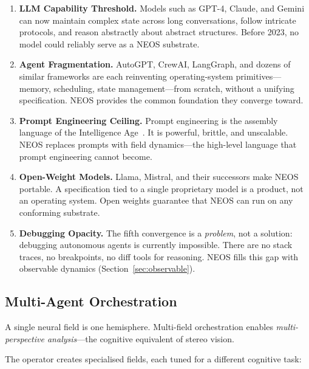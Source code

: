 \begin{enumerate}[leftmargin=*, label=\textbf{\arabic*.}]
\item \textbf{LLM Capability Threshold.}
  Models such as GPT-4, Claude, and Gemini can now maintain complex
  state across long conversations, follow intricate protocols, and
  reason abstractly about abstract structures.  Before 2023, no model
  could reliably serve as a NEOS substrate.

\item \textbf{Agent Fragmentation.}
  AutoGPT, CrewAI, LangGraph, and dozens of similar frameworks are
  each reinventing operating-system primitives---memory, scheduling,
  state management---from scratch, without a unifying specification.
  NEOS provides the common foundation they converge toward.

\item \textbf{Prompt Engineering Ceiling.}
  Prompt engineering is the assembly language of the Intelligence
  Age~\cite{reynolds2021prompt}.  It is powerful, brittle, and
  unscalable.  NEOS replaces prompts with field dynamics---the
  high-level language that prompt engineering cannot become.

\item \textbf{Open-Weight Models.}
  Llama, Mistral, and their successors make NEOS portable.  A
  specification tied to a single proprietary model is a product, not
  an operating system.  Open weights guarantee that NEOS can run on
  any conforming substrate.

\item \textbf{Debugging Opacity.}
  The fifth convergence is a \emph{problem}, not a solution: debugging
  autonomous agents is currently impossible.  There are no stack
  traces, no breakpoints, no diff tools for reasoning.  NEOS fills
  this gap with observable dynamics (Section~\ref{sec:observable}).
\end{enumerate}

\subsection{Multi-Agent Orchestration}\label{sec:multi-agent}

A single neural field is one hemisphere.  Multi-field orchestration
enables \emph{multi-perspective analysis}---the cognitive equivalent of
stereo vision.

The operator creates specialised fields, each tuned for a different
cognitive task:

